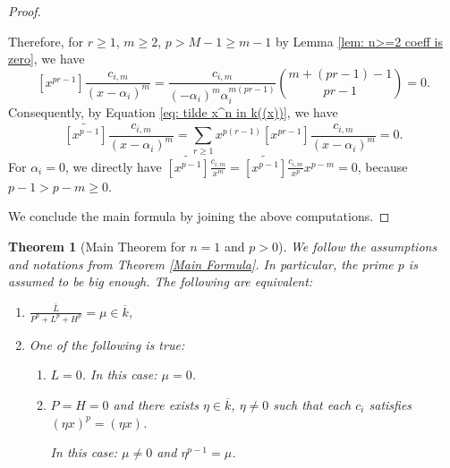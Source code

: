 \documentclass{amsart}
\newtheorem{thm}{Theorem}[section]
\theoremstyle{definition}
\begin{document}
\begin{proof}
\begin{enumerate}
        Therefore, for $r\ge 1$, $m\ge 2$, $p>M-1\ge m-1$ by Lemma \ref{lem: n>=2 coeff is zero}, we have 
        \[
        [x^{pr-1}]\frac{c_{i,m}}{(x-\alpha_i)^m}=\frac{c_{i,m}}{(-\alpha_i)^m \alpha_i^{m(pr-1)}}\binom{m+(pr-1)-1}{pr-1}=0.
        \]
        Consequently, by Equation \ref{eq: tilde x^n in k((x))}, we have
        \[
        \widetilde{[x^{p-1}]}\frac{c_{i,m}}{(x-\alpha_i)^m}=\sum_{r\ge 1} x^{p(r-1)}[x^{pr-1}]\frac{c_{i,m}}{(x-\alpha_i)^m}=0.
        \]
        For $\alpha_i=0$, we directly have
        $\widetilde{[x^{p-1}]}\frac{c_{i,m}}{x^m}=\widetilde{[x^{p-1}]}\frac{c_{i,m}}{x^p}x^{p-m}=0$, because $p-1>p-m\ge 0$.
    \end{enumerate}
    We conclude the main formula by joining the above computations.
\end{proof}

\begin{thm}[Main Theorem for $n=1$ and $p>0$]\label{thm: main: n=1, p>0}
    We follow the assumptions and notations from Theorem \ref{Main Formula}. In particular, the prime $p$ is assumed to be big enough. The following are equivalent:
    \begin{enumerate}
        \item $\frac{\overline{L}}{P^p+L^p+H^p}=\mu \in \overline{k}$,
        \item One of the following is true:
        \begin{enumerate}
            \item $L=0$. In this case: $\mu=0$.
            \item $P=H=0$ and there exists $\eta\in \overline{k}$, $\eta \ne 0$ such that each $c_i$ satisfies $(\eta x)^{p}=(\eta x)$. 
            
            In this case: $\mu \ne 0$ and $\eta^{p-1}=\mu$.
        \end{enumerate}
    \end{enumerate}
\end{thm}
\end{document}
